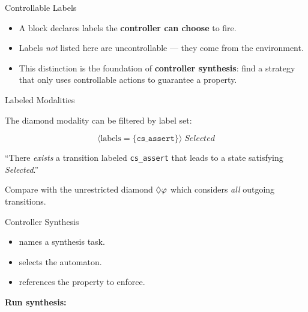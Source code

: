 \begin{frame}[fragile]{Controllable Labels}
  

  \bigskip
  \begin{itemize}
    \item A  block declares labels the \textbf{controller can choose} to fire.
    \item Labels \emph{not} listed here are \alert{uncontrollable} --- they come from the environment.
    \item This distinction is the foundation of \textbf{controller synthesis}: find a strategy that only uses controllable actions to guarantee a property.
  \end{itemize}
\end{frame}

\begin{frame}[fragile]{Labeled Modalities}
  

  \bigskip
  The diamond modality can be \alert{filtered by label set}:

  \[
    \langle \text{labels} = \{ \texttt{cs\_assert} \} \rangle\; \textit{Selected}
  \]

  ``There \emph{exists} a transition labeled \texttt{cs\_assert} that leads to a state satisfying \textit{Selected}.''

  \medskip
  Compare with the unrestricted diamond $\lozenge\varphi$ which considers \emph{all} outgoing transitions.
\end{frame}

\begin{frame}[fragile]{Controller Synthesis}
  

  \bigskip
  \begin{itemize}
    \item {} names a synthesis task.
    \item {} selects the automaton.
    \item {} references the property to enforce.
  \end{itemize}

  \medskip
  \textbf{Run synthesis:}
\end{frame}

